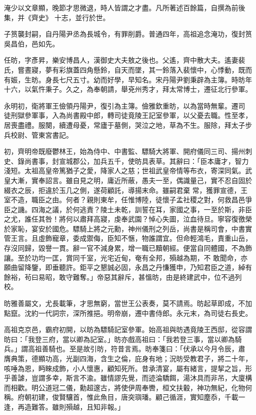 \begin{pinyinscope}
 淹少以文章顯，晚節才思微退，時人皆謂之才盡。凡所著述百餘篇，自撰為前後集，并《齊史》
 十志，並行於世。



 子筼襲封嗣，自丹陽尹丞為長城令，有罪削爵。普通四年，高祖追念淹功，復封筼吳昌伯，邑如先。



 任昉，字彥昇，樂安博昌人，漢御史大夫敖之後也。父遙，齊中散大夫。遙妻裴氏，嘗晝寢，夢有彩旗蓋四角懸鈴，自天而墜，其一鈴落入裴懷中，心悸動，既而有娠，生昉。身長七尺五寸。幼而好學，早知名。宋丹陽尹劉秉辟為主簿。時昉年十六，以氣忤秉子。久之，為奉朝請，舉兗州秀才，拜太常博士，遷征北行參軍。



 永明初，衛將軍王儉領丹陽尹，復引為主簿。儉雅欽重昉，以為當時無輩。遷司
 徒刑獄參軍事，入為尚書殿中郎，轉司徒竟陵王記室參軍，以父憂去職。性至孝，居喪盡禮。服闋，續遭母憂，常廬于墓側，哭泣之地，草為不生。服除，拜太子步兵校尉、管東宮書記。



 初，齊明帝既廢鬱林王，始為侍中、中書監、驃騎大將軍、開府儀同三司、揚州刺史、錄尚書事，封宣城郡公，加兵五千，使昉具表草。其辭曰：「臣本庸才，智力淺短。太祖高皇帝篤猶子之愛，降家人之慈；世祖武皇帝情等布衣，寄深同氣。武皇大漸，實奉詔言。雖自見之明，庸近所蔽，愚夫一至，偶識量己，實不忍自固於綴衣之辰，拒違於玉几之側，遂荷顧託，導揚末命。雖嗣君棄
 常，獲罪宣德，王室不造，職臣之由。何者？親則東牟，任惟博陸，徒懷子孟社稷之對，何救昌邑爭臣之譏。四海之議，於何逃責？陵土未乾，訓誓在耳，家國之事，一至於斯，非臣之尤，誰任其咎！將何以肅拜高寢，虔奉武園？悼心失圖，泣血待旦。寧容復徼榮於家恥，宴安於國危。驃騎上將之元勳，神州儀刑之列岳，尚書是稱司會，中書實管王言。且虛飾寵章，委成禦侮，臣知不愜，物誰謂宜。但命輕鴻毛，責重山岳，存沒同歸，毀譽一貫。辭一官不減身累，增一職已黷朝經。便當自同體國，不為飾讓。至於功均一匡，賞同千室，光宅近甸，奄有全邦，殞越為期，不
 敢聞命，亦願曲留降鑒，即垂聽許。鉅平之懇誠必固，永昌之丹慊獲申，乃知君臣之道，綽有餘裕，茍曰易昭，敢守難奪。」帝惡其辭斥，甚慍昉，由是終建武中，位不過列校。



 昉雅善屬文，尤長載筆，才思無窮，當世王公表奏，莫不請焉。昉起草即成，不加點竄。沈約一代詞宗，深所推挹。明帝崩，遷中書侍郎。永元末，為司徒右長史。



 高祖克京邑，霸府初開，以昉為驃騎記室參軍。始高祖與昉遇竟陵王西邸，從容謂昉曰：「我登三府，當以卿為記室。」昉亦戲高祖曰：「我若登三事，當以卿為騎兵。」謂高祖善騎也。至是故引昉，符昔言焉。昉奉箋曰：「伏承以今月令辰，肅
 膺典策，德顯功高，光副四海，含生之倫，庇身有地；況昉受教君子，將二十年，咳唾為恩，眄睞成飾，小人懷惠，顧知死所。昔承清宴，屬有緒言，提挈之旨，形乎善謔，豈謂多幸，斯言不渝。雖情謬先覺，而迹淪驕餌，湯沐具而非吊，大廈構而相歡。明公道冠二儀，勳超邃古，將使伊周奉轡，桓文扶轂，神功無紀，化物何稱。府朝初建，俊賢驤首，惟此魚目，唐突璵璠。顧己循涯，實知塵忝，千載一逢，再造難答。雖則殞越，且知非報。」




\end{pinyinscope}
